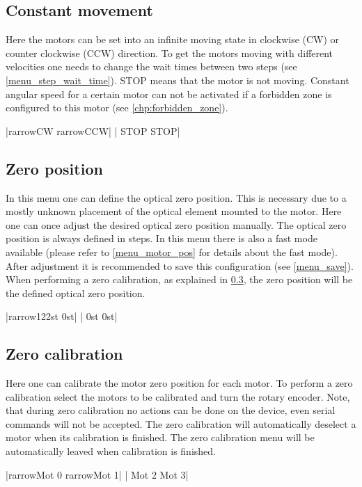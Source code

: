 \subsection{Constant movement}
Here the motors can be set into an infinite moving state in clockwise
(CW) or counter clockwise (CCW) direction. To get the motors moving
with different velocities one needs to change the wait times between
two steps (see \ref{menu_step_wait_time}).
STOP means that the motor is not moving. Constant angular speed for a
certain motor can not be activated if a forbidden zone is configured to
this motor (see \ref{chp:forbidden_zone}).
\begin{center}
  |{rarrow}CW     {rarrow}CCW|
             | STOP    STOP|
\end{center}

\subsection{Zero position}
In this menu one can define the optical zero position. This is
necessary due to a mostly unknown placement of the optical element
mounted to the motor. Here one can once adjust the desired optical
zero position manually. The optical zero position is always
defined in steps. In this menu there is also a fast mode available
(please refer to \ref{menu_motor_pos} for details about the fast mode).
After adjustment it is recommended to save this configuration
(see \ref{menu_save}).
When performing a zero calibration, as explained in \ref{menu_zero_cal},
the zero position will be the defined optical zero position.
\begin{center}
  |{rarrow}122st   0st|
             | 0st     0st|
\end{center}

\subsection{Zero calibration}
\label{menu_zero_cal}
Here one can calibrate the motor zero position for each motor. To
perform a zero calibration select the motors to be calibrated and
turn the rotary encoder. Note, that during zero calibration no actions
can be done on the device, even serial commands will not be accepted.
The zero calibration will automatically deselect a motor when its
calibration is finished. The zero calibration menu will be automatically
leaved when calibration is finished.
\begin{center}
  |{rarrow}Mot 0  {rarrow}Mot 1|
             | Mot 2   Mot 3|
\end{center}

